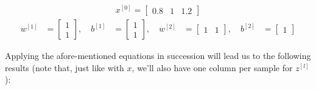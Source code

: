 \documentclass[12pt]{article}
\begin{document}
\begin{enumerate}[leftmargin=\labelsep]
        \begin{equation*}
          \begin{aligned}
            x^{[0]} = \begin{bmatrix}
                        0.8 & 1 & 1.2
                      \end{bmatrix}
          \end{aligned}
        \end{equation*}
        \begin{equation*}
          \begin{aligned}
            w^{[1]} & = \begin{bmatrix}
                          1 \\
                          1
                        \end{bmatrix}, \quad
            b^{[1]} & = \begin{bmatrix}
                          1 \\
                          1
                        \end{bmatrix}, \quad
            w^{[2]} & = \begin{bmatrix}
                          1 & 1
                        \end{bmatrix}, \quad
            b^{[2]} & = \begin{bmatrix}
                          1
                        \end{bmatrix}
          \end{aligned}
        \end{equation*}

        \pagebreak

        Applying the afore-mentioned equations in succession will lead us to the following results
        (note that, just like with $x$, we'll also have one column per sample
        for $z^{[l]}$):



\end{enumerate}
\end{document}

